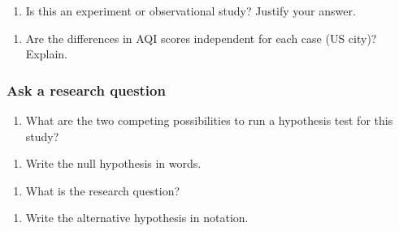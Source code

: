 \documentclass[
]{report}
\providecommand{\tightlist}{%
  \setlength{\itemsep}{0pt}\setlength{\parskip}{0pt}}
\begin{document}
\vspace{1in}

\begin{enumerate}
\def\labelenumi{\arabic{enumi}.}
\setcounter{enumi}{3}
\tightlist
\item
  Is this an experiment or observational study? Justify your answer.
\end{enumerate}

\vspace{0.3in}

\begin{enumerate}
\def\labelenumi{\arabic{enumi}.}
\setcounter{enumi}{4}
\tightlist
\item
  Are the differences in AQI scores independent for each case (US city)? Explain.
\end{enumerate}

\vspace{0.3in}

\hypertarget{ask-a-research-question-2}{%
\subsubsection*{Ask a research question}\label{ask-a-research-question-2}}

\begin{enumerate}
\def\labelenumi{\arabic{enumi}.}
\setcounter{enumi}{5}
\tightlist
\item
  What are the two competing possibilities to run a hypothesis test for this study?
\end{enumerate}

\vspace{1in}

\begin{enumerate}
\def\labelenumi{\arabic{enumi}.}
\setcounter{enumi}{6}
\tightlist
\item
  Write the null hypothesis in words.
\end{enumerate}

\vspace{1in}

\begin{enumerate}
\def\labelenumi{\arabic{enumi}.}
\setcounter{enumi}{7}
\tightlist
\item
  What is the research question?
\end{enumerate}

\vspace{1in}

\begin{enumerate}
\def\labelenumi{\arabic{enumi}.}
\setcounter{enumi}{8}
\tightlist
\item
  Write the alternative hypothesis in notation.
\end{enumerate}
\end{document}
